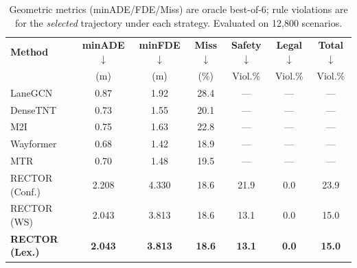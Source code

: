 \begin{table}[t]
\centering
\caption{Trajectory Prediction and Rule Compliance on WOMD Validation}
\label{tab:main_results}
\begin{tabular}{lcccccc}
\toprule
\textbf{Method} & \textbf{minADE} $\downarrow$ & \textbf{minFDE} $\downarrow$ & \textbf{Miss} $\downarrow$ & \textbf{Safety} $\downarrow$ & \textbf{Legal} $\downarrow$ & \textbf{Total} $\downarrow$ \\
 & (m) & (m) & (\%) & Viol.\% & Viol.\% & Viol.\% \\
\midrule
LaneGCN & 0.87 & 1.92 & 28.4 & --- & --- & --- \\
DenseTNT & 0.73 & 1.55 & 20.1 & --- & --- & --- \\
M2I & 0.75 & 1.63 & 22.8 & --- & --- & --- \\
Wayformer & 0.68 & 1.42 & 18.9 & --- & --- & --- \\
MTR & 0.70 & 1.48 & 19.5 & --- & --- & --- \\
\midrule
RECTOR (Conf.) & 2.208 & 4.330 & 18.6 & 21.9 & 0.0 & 23.9 \\
RECTOR (WS) & 2.043 & 3.813 & 18.6 & 13.1 & 0.0 & 15.0 \\
\textbf{RECTOR (Lex.)} & \textbf{2.043} & \textbf{3.813} & \textbf{18.6} & \textbf{13.1} & \textbf{0.0} & \textbf{15.0} \\
\bottomrule
\end{tabular}
\vspace{1mm}
\caption*{\footnotesize Geometric metrics (minADE/FDE/Miss) are oracle best-of-6;
rule violations are for the \emph{selected} trajectory under each strategy.
Evaluated on 12,800 scenarios.}
\end{table}
